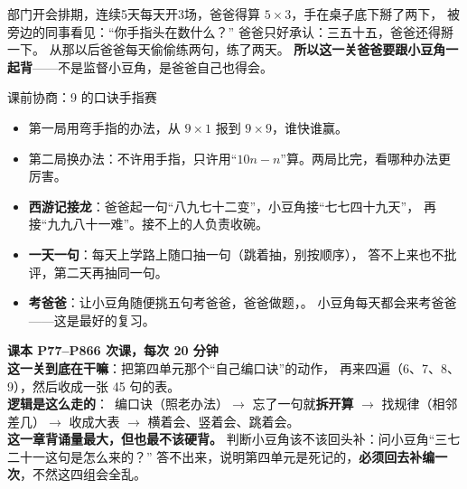 
\begin{blunder}
部门开会排期，连续5天每天开3场，爸爸得算 $5\times3$，手在桌子底下掰了两下，
被旁边的同事看见：“你手指头在数什么？”
爸爸只好承认：三五十五，爸爸还得掰一下。
从那以后爸爸每天偷偷练两句，练了两天。
\textbf{所以这一关爸爸要跟小豆角一起背}——不是监督小豆角，是爸爸自己也得会。
\end{blunder}

\begin{gamble}{课前协商：9 的口诀手指赛}
\begin{itemize}
  \item 第一局用弯手指的办法，从 $9\times1$ 报到 $9\times9$，谁快谁赢。
  \item 第二局换办法：不许用手指，只许用“$10n-n$”算。两局比完，看哪种办法更厉害。
\end{itemize}
\negolines
\end{gamble}

\begin{bonus}
\begin{itemize}
  \item \textbf{西游记接龙}：爸爸起一句“八九七十二变”，小豆角接“七七四十九天”，
        再接“九九八十一难”。接不上的人负责收碗。
  \item \textbf{一天一句}：每天上学路上随口抽一句（跳着抽，别按顺序），
        答不上来也不批评，第二天再抽同一句。
  \item \textbf{考爸爸}：让小豆角随便挑五句考爸爸，爸爸做题，。
        小豆角每天都会来考爸爸——这是最好的复习。
\end{itemize}
\end{bonus}

\begin{unitinfo}
\textbf{课本 P77--P86}\quad \textbf{6 次课，每次 20 分钟} \\[4pt]
\textbf{这一关到底在干嘛}：把第四单元那个“自己编口诀”的动作，
再来四遍（6、7、8、9），然后收成一张 45 句的表。\\
\textbf{逻辑是这么走的}：\ 编口诀（照老办法）$\to$ 忘了一句就\textbf{拆开算}
$\to$ 找规律（相邻差几）$\to$ 收成大表 $\to$ 横着会、竖着会、跳着会。\\
\textbf{这一章背诵量最大，但也最不该硬背。}
判断小豆角该不该回头补：问小豆角“三七二十一这句是怎么来的？”
答不出来，说明第四单元是死记的，\textbf{必须回去补编一次}，不然这四组会全乱。
\end{unitinfo}

